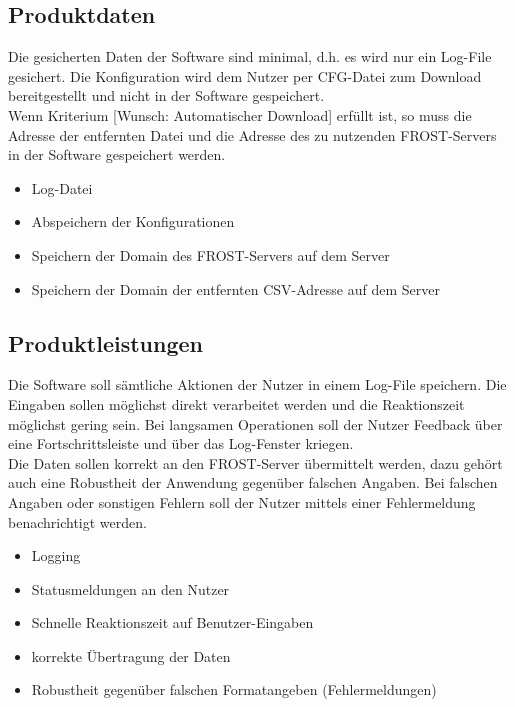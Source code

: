\documentclass[12 pt]{article}
\begin{document}
\subsection{Produktdaten}
Die gesicherten Daten der Software sind minimal, d.h. es wird nur ein Log-File gesichert. Die Konfiguration wird dem Nutzer per CFG-Datei zum Download bereitgestellt und nicht in der Software gespeichert.\\
Wenn Kriterium [Wunsch: Automatischer Download] erfüllt ist, so muss die Adresse der entfernten Datei und die Adresse des zu nutzenden FROST-Servers in der Software gespeichert werden.
\begin{itemize}
\item Log-Datei
\item Abspeichern der Konfigurationen
\item Speichern der Domain des FROST-Servers auf dem Server
\item Speichern der Domain der entfernten CSV-Adresse auf dem Server
\end{itemize}

\subsection{Produktleistungen}
Die Software soll sämtliche Aktionen der Nutzer in einem Log-File speichern. Die Eingaben sollen möglichst direkt verarbeitet werden und die Reaktionszeit möglichst gering sein. Bei langsamen Operationen soll der Nutzer Feedback über eine Fortschrittsleiste und über das Log-Fenster kriegen. \\
Die Daten sollen korrekt an den FROST-Server übermittelt werden, dazu gehört auch eine Robustheit der Anwendung gegenüber falschen Angaben. Bei falschen Angaben oder sonstigen Fehlern soll der Nutzer mittels einer Fehlermeldung benachrichtigt werden.
\begin{itemize}
\item Logging
\item Statusmeldungen an den Nutzer
\item Schnelle Reaktionszeit auf Benutzer-Eingaben
\item korrekte Übertragung der Daten
\item Robustheit gegenüber falschen Formatangeben (Fehlermeldungen)
\end{itemize}
\end{document}
